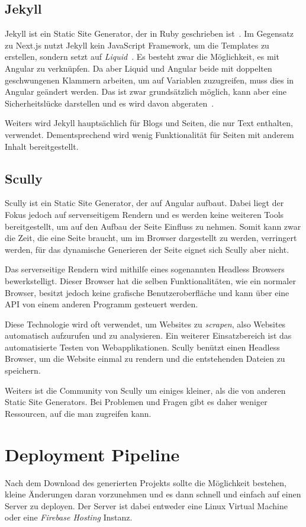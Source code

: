 \subsection{Jekyll}
Jekyll ist ein Static Site Generator, der in Ruby geschrieben ist~\cite{jekyll-ruby}.
Im Gegensatz zu Next.js nutzt Jekyll kein JavaScript Framework, um die Templates zu erstellen, sondern setzt
auf \textit{Liquid}~\cite{jekyll-liquid}.
Es besteht zwar die Möglichkeit, es mit Angular zu verknüpfen.
Da aber Liquid und Angular beide mit doppelten geschwungenen Klammern arbeiten, um auf Variablen zuzugreifen, muss
dies in Angular geändert werden.
Das ist zwar grundsätzlich möglich, kann aber eine Sicherheitslücke darstellen und es wird davon abgeraten~\cite{angular-interpolation}.

Weiters wird Jekyll hauptsächlich für Blogs und Seiten, die nur Text enthalten, verwendet.
Dementsprechend wird wenig Funktionalität für Seiten mit anderem Inhalt bereitgestellt.

\subsection{Scully}
Scully ist ein Static Site Generator, der auf Angular aufbaut.
Dabei liegt der Fokus jedoch auf serverseitigem Rendern und es werden keine weiteren Tools bereitgestellt, um auf
den Aufbau der Seite Einfluss zu nehmen.
Somit kann zwar die Zeit, die eine Seite braucht, um im Browser dargestellt zu werden, verringert werden, für das
dynamische Generieren der Seite eignet sich Scully aber nicht.

Das serverseitige Rendern wird mithilfe eines sogenannten Headless Browsers bewerkstelligt.
Dieser Browser hat die selben Funktionalitäten, wie ein normaler Browser, besitzt jedoch keine grafische
Benutzeroberfläche und kann über eine API von einem anderen Programm gesteuert werden.

Diese Technologie wird oft verwendet, um Websites zu \textit{scrapen}, also Websites automatisch aufzurufen
und zu analysieren.
Ein weiterer Einsatzbereich ist das automatisierte Testen von Webapplikationen.
Scully benützt einen Headless Browser, um die Website einmal zu rendern und die entstehenden Dateien zu speichern.

Weiters ist die Community von Scully um einiges kleiner, als die von anderen Static Site Generators.
Bei Problemen und Fragen gibt es daher weniger Ressourcen, auf die man zugreifen kann.

\section{Deployment Pipeline}
Nach dem Download des generierten Projekts sollte die Möglichkeit bestehen,
kleine Änderungen daran vorzunehmen und es dann schnell und einfach auf einen
Server zu deployen.
Der Server ist dabei entweder eine Linux Virtual Machine oder eine \textit{Firebase Hosting} Instanz.

